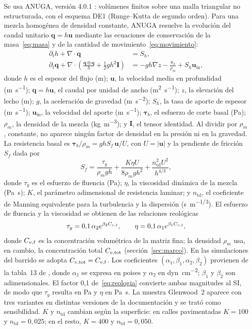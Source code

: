 Se usa ANUGA, versión 4.0.1 \citep{anuga}: volúmenes finitos sobre una malla triangular no estructurada, con el esquema DE1 (Runge--Kutta de segundo orden). Para una mezcla homogénea de densidad constante, ANUGA resuelve la evolución del caudal unitario $\mathbf q=h\mathbf u$ mediante las ecuaciones de conservación de la masa~\eqref{eq:masa} y de la cantidad de movimiento~\eqref{eq:movimiento}:
\begin{align}
\partial_t h+\nabla\cdot\mathbf q&=S_h,\label{eq:masa}\\
\partial_t\mathbf q+\nabla\cdot\left(\frac{\mathbf q\otimes\mathbf q}{h}+\tfrac12 gh^2\mathbf I\right)&=-gh\nabla z-\frac{\boldsymbol\tau_b}{\rho_m}+S_h\mathbf u_\mathrm{in},\label{eq:movimiento}
\end{align}
donde $h$ es el espesor del flujo (\si{m}); $\mathbf u$, la velocidad media en profundidad (\si{m.s^{-1}}); $\mathbf q=h\mathbf u$, el caudal por unidad de ancho (\si{m^2.s^{-1}}); $z$, la elevación del lecho (\si{m}); $g$, la aceleración de gravedad (\si{m.s^{-2}}); $S_h$, la tasa de aporte de espesor (\si{m.s^{-1}}); $\mathbf u_\mathrm{in}$, la velocidad del aporte (\si{m.s^{-1}}); $\boldsymbol\tau_b$, el esfuerzo de corte basal (\si{Pa}); $\rho_m$, la densidad de la mezcla (\si{kg.m^{-3}}); y $\mathbf I$, el tensor identidad. Al dividir por $\rho_m$, constante, no aparece ningún factor de densidad en la presión ni en la gravedad. La resistencia basal es $\boldsymbol\tau_b/\rho_m=ghS_f\,\mathbf u/U$, con $U=|\mathbf u|$ y la pendiente de fricción $S_f$ dada por
\begin{equation}
S_f=\frac{\tau_y}{\rho_m g h}+\frac{K\eta U}{8\rho_m g h^2}+\frac{n_\mathrm{td}^2U^2}{h^{4/3}},\label{eq:friccion}
\end{equation}
donde $\tau_y$ es el esfuerzo de fluencia (\si{Pa}); $\eta$, la viscosidad dinámica de la mezcla (\si{Pa.s}); $K$, el parámetro adimensional de resistencia laminar; y $n_\mathrm{td}$, el coeficiente de Manning equivalente para la turbulencia y la dispersión (\si{s.m^{-1/3}}). El esfuerzo de fluencia y la viscosidad se obtienen de las relaciones reológicas
\begin{equation}
\tau_y=0{,}1\,\alpha_2e^{\beta_2C_{v,\mathrm{f}}},\qquad \eta=0{,}1\,\alpha_1e^{\beta_1C_{v,\mathrm{f}}},\label{eq:reologia}
\end{equation}
donde $C_{v,\mathrm{f}}$ es la concentración volumétrica de la matriz fina; la densidad $\rho_m$ usa, en cambio, la concentración total $C_{v,\mathrm{tot}}$ (sección~\ref{sec:marco}). En las simulaciones del barrido se adopta $C_{v,\mathrm{tot}}=C_{v,\mathrm{f}}$. Los coeficientes $(\alpha_1,\beta_1,\alpha_2,\beta_2)$ provienen de la tabla~13 de \citet{flo2d2021}, donde $\alpha_1$ se expresa en poises y $\alpha_2$ en \si{dyn.cm^{-2}}; $\beta_1$ y $\beta_2$ son adimensionales. El factor 0,1 de~\eqref{eq:reologia} convierte ambas magnitudes al SI, de modo que $\tau_y$ resulta en \si{Pa} y $\eta$ en \si{Pa.s}. La muestra Glenwood~2 aparece con tres variantes en distintas versiones de la documentación y se trató como sensibilidad. $K$ y $n_\mathrm{td}$ cambian según la superficie: en calles pavimentadas $K=100$ y $n_\mathrm{td}=0{,}025$; en el resto, $K=400$ y $n_\mathrm{td}=0{,}050$.

